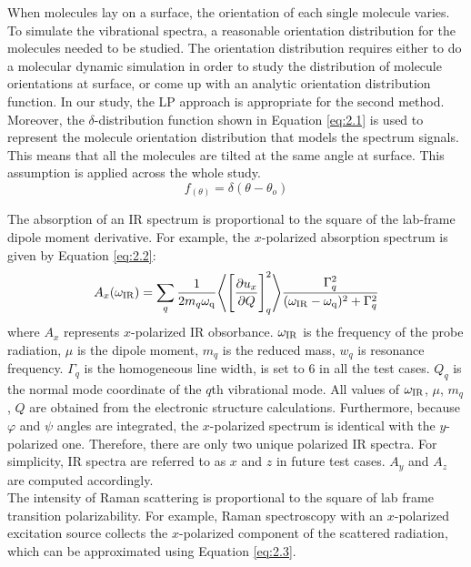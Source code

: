 When molecules lay on a surface, the orientation of each single molecule varies. To simulate the vibrational spectra, a reasonable orientation distribution for the molecules needed to be studied. The orientation distribution requires either to do a molecular dynamic simulation in order to study the distribution of molecule orientations at surface, or come up with an analytic orientation distribution function. In our study, the LP approach is appropriate for the second method. Moreover, the $\delta$-distribution function shown in Equation \ref{eq:2.1} is used to represent the molecule orientation distribution that models the spectrum signals. This means that all the molecules are tilted at the same angle at surface. This assumption is applied across the whole study. \\

\begin{equation} \label{eq:2.1}
f_{(\theta)} = \delta(\theta - \theta_{o})
\end{equation} 

The absorption of an IR spectrum is proportional to the square of the lab-frame dipole moment derivative. For example, the $x$-polarized absorption spectrum is given by Equation \ref{eq:2.2}: \\

\begin{equation} \label{eq:2.2}
A_x(\omega_{\rm IR}) = \sum_{q} \frac{1}{2 m_{q} \omega_{\rm q}} \Bigg \langle \Bigg\lbrack \frac{\partial u_x}{\partial Q} \Bigg\rbrack_{q} ^2 \Bigg\rangle \frac{\Gamma_q^2}{(\omega_{\rm IR}-\omega_{\rm q})^2 + \Gamma_q^2}
\end{equation} 
where $A_x$ represents $x$-polarized IR obsorbance. $\omega_{\rm IR}$ is the frequency of the probe radiation, $\mu$ is the dipole moment, $m_q$ is the reduced mass, $w_q$ is resonance frequency. $\Gamma_q$ is the homogeneous line width, is set to $6$ in all the test cases. $Q_q$ is the normal mode coordinate of the $q$th vibrational mode. All values of $\omega_{\rm IR}$, $\mu$, $m_q$, $Q$ are obtained from the electronic structure calculations. Furthermore, because $\varphi$ and $\psi$ angles are integrated, the $x$-polarized spectrum is identical with the $y$-polarized one. Therefore, there are only two unique polarized IR spectra. For simplicity, IR spectra are referred to as $x$ and $z$ in future test cases. $A_y$ and $A_z$ are computed accordingly.\\

The intensity of Raman scattering is proportional to the square of lab frame transition polarizability. For example, Raman spectroscopy with an $x$-polarized excitation source collects the $x$-polarized component of the scattered radiation, which can be approximated using Equation \ref{eq:2.3}. \\

